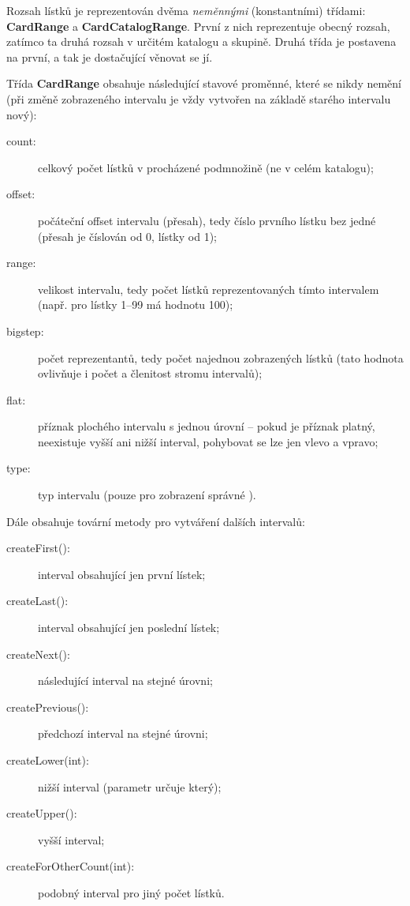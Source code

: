 Rozsah lístků je reprezentován dvěma {\em neměnnými} (konstantními) třídami: {\bf CardRange} a {\bf CardCatalogRange}. První z nich reprezentuje obecný rozsah, zatímco ta druhá rozsah v určitém katalogu a skupině. Druhá třída je postavena na první, a tak je dostačující věnovat se jí.

Třída {\bf CardRange} obsahuje následující stavové proměnné, které se nikdy nemění (při změně zobrazeného intervalu je vždy vytvořen na základě starého intervalu nový):

\begin{description}
\item[count:]{celkový počet lístků v procházené podmnožině (ne v celém katalogu);}
\item[offset:]{počáteční offset intervalu (přesah), tedy číslo prvního lístku bez jedné (přesah je číslován od 0, lístky od 1);}
\item[range:]{velikost intervalu, tedy počet lístků reprezentovaných tímto intervalem (např. pro lístky 1--99 má hodnotu 100);}
\item[bigstep:]{počet reprezentantů, tedy počet najednou zobrazených lístků (tato hodnota ovlivňuje i počet a členitost stromu intervalů);}
\item[flat:]{příznak plochého intervalu s jednou úrovní -- pokud je příznak platný, neexistuje vyšší ani nižší interval, pohybovat se lze jen vlevo a vpravo;}
\item[type:]{typ intervalu (pouze pro zobrazení správné ).}
\end{description}

Dále obsahuje tovární metody pro vytváření dalších intervalů:

\begin{description}
\item[createFirst():]{interval obsahující jen první lístek;}
\item[createLast():]{interval obsahující jen poslední lístek;}
\item[createNext():]{následující interval na stejné úrovni;}
\item[createPrevious():]{předchozí interval na stejné úrovni;}
\item[createLower(int):]{nižší interval (parametr určuje který);}
\item[createUpper():]{vyšší interval;}
\item[createForOtherCount(int):]{podobný interval pro jiný počet lístků.}
\end{description}

